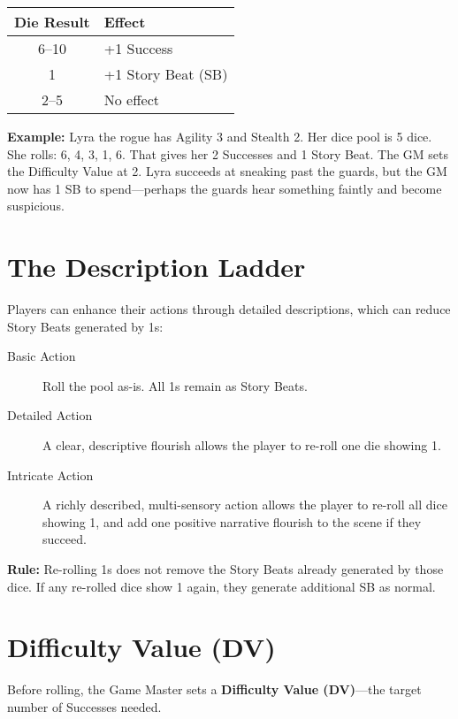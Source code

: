 \documentclass[11pt,twoside,openany]{book}
\begin{document}
\begin{center}
\begin{tabular}{|c|l|}
\hline
\textbf{Die Result} & \textbf{Effect} \\
\hline
6--10 & +1 Success \\
1 & +1 Story Beat (SB) \\
2--5 & No effect \\
\hline
\end{tabular}
\end{center}

\textbf{Example:} Lyra the rogue has Agility 3 and Stealth 2. Her dice pool is 5 dice. She rolls: 6, 4, 3, 1, 6. That gives her 2 Successes and 1 Story Beat. The GM sets the Difficulty Value at 2. Lyra succeeds at sneaking past the guards, but the GM now has 1 SB to spend—perhaps the guards hear something faintly and become suspicious.

\section*{The Description Ladder} 

Players can enhance their actions through detailed descriptions, which can reduce Story Beats generated by 1s:

\begin{description}
\item[Basic Action] Roll the pool as-is. All 1s remain as Story Beats.
\item[Detailed Action] A clear, descriptive flourish allows the player to re-roll one die showing 1.
\item[Intricate Action] A richly described, multi-sensory action allows the player to re-roll all dice showing 1, and add one positive narrative flourish to the scene if they succeed.
\end{description}

\textbf{Rule:} Re-rolling 1s does not remove the Story Beats already generated by those dice. If any re-rolled dice show 1 again, they generate additional SB as normal.

\section*{Difficulty Value (DV)} 

Before rolling, the Game Master sets a \textbf{Difficulty Value (DV)}—the target number of Successes needed.
\end{document}
